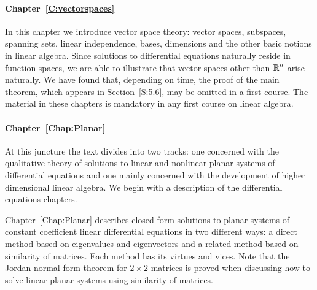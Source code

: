 \documentclass{ximera}
\begin{document}
\paragraph{Chapter~\ref{C:vectorspaces}} In this chapter we introduce vector 
space theory: vector spaces, subspaces, spanning sets, linear independence, 
bases, dimensions and the other basic notions in linear algebra.  Since 
solutions to differential equations naturally reside in function spaces, we 
are able to illustrate that vector spaces other than $\mbox{$\mathbb{R}$}^n$ arise naturally.  
We have found that, depending on time, the proof of the main theorem, which 
appears in Section~\ref{S:5.6}, may be omitted in a first course.  The 
material in these chapters is mandatory in any first course on linear algebra.


\paragraph{Chapter~\ref{Chap:Planar}}

At this juncture the text divides into two tracks: one concerned with
the qualitative theory of solutions to linear and nonlinear planar
systems of differential equations and one mainly concerned with the
development of higher dimensional linear algebra.  We begin with a
description of the differential equations chapters.

Chapter~\ref{Chap:Planar} describes closed form solutions to planar
systems of constant coefficient linear differential equations in two
different ways: a direct method based on eigenvalues and eigenvectors
 and a related method based on
similarity of matrices.  Each method has its virtues and
vices.  Note that the Jordan normal form theorem for $2\times 2$
matrices is proved when discussing how to solve linear planar systems
using similarity of matrices.


\end{document}
